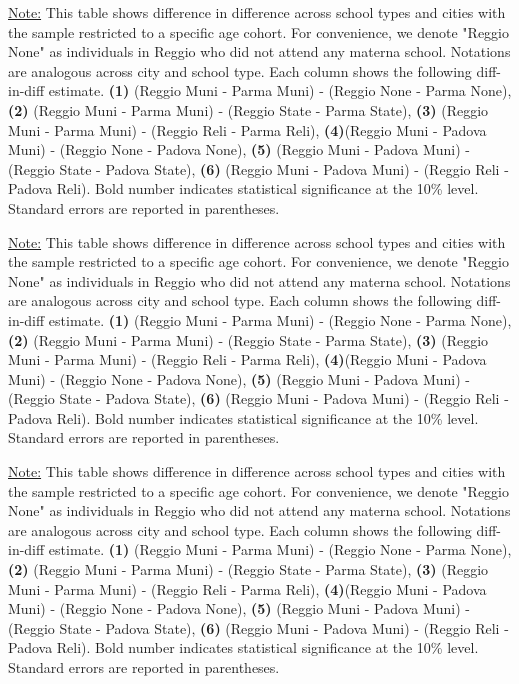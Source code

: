 \documentclass[11pt]{article}
\newcommand{\fnDID}{\underline{Note:} This table shows difference in difference across school types and cities with the sample restricted to a specific age cohort. For convenience, we denote "Reggio None" as individuals in Reggio who did not attend any materna school. Notations are analogous across city and school type. Each column shows the following diff-in-diff estimate. \textbf{(1)} (Reggio Muni - Parma Muni) - (Reggio None - Parma None), \textbf{(2)} (Reggio Muni - Parma Muni) - (Reggio State - Parma State), \textbf{(3)} (Reggio Muni - Parma Muni) - (Reggio Reli - Parma Reli), \textbf{(4)}(Reggio Muni - Padova Muni) - (Reggio None - Padova None),  \textbf{(5)}  (Reggio Muni - Padova Muni) - (Reggio State - Padova State), \textbf{(6)}  (Reggio Muni - Padova Muni) - (Reggio Reli - Padova Reli). Bold number indicates statistical significance at the 10\% level. Standard errors are reported in parentheses.}
\begin{document}

\begin{table}[H]
\begin{center}
	\caption{Difference-in-Difference Across School Types and Cities, Restricting to Age-30 Cohort} \label{table:NCh-30}
	\scalebox{0.80}{
		}
\end{center}
\footnotesize
\fnDID
\end{table}

\begin{table}[H]
\begin{center}
	\caption{Difference-in-Difference Across School Types and Cities, Restricting to Age-40 Cohort} \label{table:NCh-40}
	\scalebox{0.80}{
		}
\end{center}
\footnotesize
\fnDID
\end{table}

\begin{table}[H]
\begin{center}
	\caption{Difference-in-Difference Across School Types and Cities, Restricting to Age-50 Cohort} \label{table:NCh-50}
	\scalebox{0.80}{
		}
\end{center}
\footnotesize
\fnDID
\end{table}
\end{document}
